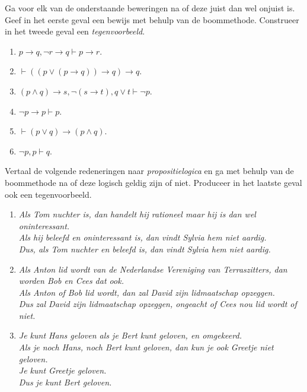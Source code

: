 \begin{exercise}Ga voor elk van de onderstaande beweringen na of deze juist dan wel onjuist is. Geef in het eerste geval een bewijs met behulp van de boommethode. Construeer in het tweede geval een \textit{tegenvoorbeeld}.
\begin{enumerate}[label=\textit{\alph*.}]
\item $p\rightarrow q,\neg r\rightarrow q\vdash p\rightarrow r$.
\item $\vdash ((p\lor(p\rightarrow q))\rightarrow q)\rightarrow q$.
\item $(p\land q)\rightarrow s, \neg(s\rightarrow t), q\lor t\vdash \neg p$.
\item $\neg p\rightarrow p\vdash p$.
\item $\vdash (p\lor q)\rightarrow (p\land q)$.
\item $\neg p,p\vdash q$.
\end{enumerate}
\end{exercise}
\begin{exercise} Vertaal de volgende redeneringen naar \textit{propositielogica} en ga met behulp van de boommethode na of deze logisch geldig zijn of niet. Produceer in het laatste geval ook een tegenvoorbeeld.
\begin{enumerate}[label=\textit{\alph*.}]
\item \textit{Als Tom nuchter is, dan handelt hij rationeel maar hij is dan wel oninteressant.}\\
\textit{Als hij beleefd en oninteressant is, dan vindt Sylvia hem niet aardig.}\\
\textit{Dus, als Tom nuchter en beleefd is, dan vindt Sylvia hem niet aardig.}
\item\textit{Als Anton lid wordt van de Nederlandse Vereniging van Terraszitters, dan worden Bob en Cees dat ook.}\\
\textit{Als Anton of Bob lid wordt, dan zal David zijn lidmaatschap opzeggen.}\\
\textit{Dus zal David zijn lidmaatschap opzeggen, ongeacht of Cees nou lid wordt of niet.}
\item\textit{Je kunt Hans geloven als je Bert kunt geloven, en omgekeerd.}\\
\textit{Als je noch Hans, noch Bert kunt geloven, dan kun je ook Greetje niet geloven.}\\
\textit{Je kunt Greetje geloven.}\\
\textit{Dus je kunt Bert geloven.}
\end{enumerate}

\end{exercise}

